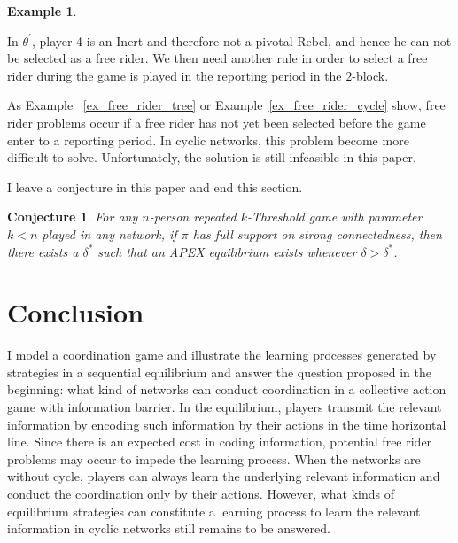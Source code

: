 \documentclass[12pt,letter]{article}
\newtheorem{conjecture}{Conjecture}[section]
\theoremstyle{definition}
\newtheorem{example}{Example}[section]
\theoremstyle{remark}
\theoremstyle{claim}
\begin{document}
\begin{example}
\begin{center}
\end{center}

In $\theta^{'}$, player 4 is an Inert and therefore not a pivotal Rebel, and hence he can not be selected as a free rider. We then need another rule in order to select a free rider during the game is played in the reporting period in the $2$-block. 
\end{example}

As Example ~\ref{ex_free_rider_tree} or Example~\ref{ex_free_rider_cycle} show, free rider problems occur if a free rider has not yet been selected before the game enter to a reporting period. In cyclic networks, this problem become more difficult to solve. Unfortunately, the solution is still infeasible in this paper. 

I leave a conjecture in this paper and end this section.

\begin{conjecture}
For any $n$-person repeated $k$-Threshold game with parameter $ k < n$ played in any network,
if $\pi$ has full support on strong connectedness, then there exists a $\delta^{*}$ such that an APEX equilibrium exists whenever $\delta>\delta^{*}$.
\end{conjecture}



\section{Conclusion}
\label{sec:con}

I model a coordination game and illustrate the learning processes generated by strategies in a sequential equilibrium and answer the question proposed in the beginning: what kind of networks can conduct coordination in a collective action game with information barrier. In the equilibrium, players transmit the relevant information by encoding such information by their actions in the time horizontal line. Since there is an expected cost in coding information, potential free rider problems may occur to impede the learning process. When the networks are without cycle, players can always learn the underlying relevant information and conduct the coordination only by their actions. However, what kinds of equilibrium strategies can constitute a learning process to learn the relevant information in cyclic networks still remains to be answered.
\end{document}
